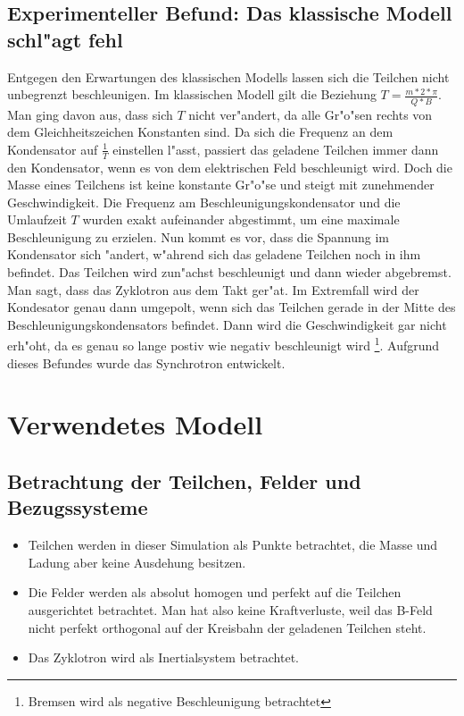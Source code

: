 \documentclass[14pt, a4paper]{report}
\begin{document}
\section{Experimenteller Befund: Das klassische Modell schl"agt fehl}
Entgegen den Erwartungen des klassischen Modells
lassen sich die Teilchen nicht unbegrenzt beschleunigen. Im klassischen Modell
gilt die Beziehung $T = \frac{m * 2 * \pi }{Q * B}$.
Man ging davon aus, dass sich $T$ nicht ver"andert, da alle Gr"o"sen rechts von dem 
Gleichheitszeichen Konstanten sind. Da sich die Frequenz an dem Kondensator auf
$\frac{1}{T}$ einstellen l"asst, passiert das geladene Teilchen immer dann den Kondensator,
wenn es von dem elektrischen Feld beschleunigt wird. Doch die Masse eines Teilchens
ist keine konstante Gr"o"se  und steigt mit zunehmender 
Geschwindigkeit. Die Frequenz am Beschleunigungskondensator und die Umlaufzeit $T$ 
wurden
exakt aufeinander abgestimmt, um eine maximale Beschleunigung zu erzielen.
Nun kommt es vor, dass die Spannung im Kondensator sich "andert, w"ahrend sich das 
geladene Teilchen noch in ihm befindet. Das Teilchen wird zun"achst beschleunigt und
dann wieder abgebremst. Man sagt, dass das Zyklotron aus dem Takt ger"at.
Im Extremfall wird der Kondesator genau dann umgepolt, wenn sich das 
Teilchen gerade in der Mitte des Beschleunigungskondensators befindet. Dann wird die 
Geschwindigkeit gar nicht erh"oht, da es genau so lange postiv wie negativ beschleunigt 
wird \footnote{Bremsen wird als negative Beschleunigung betrachtet}.
Aufgrund dieses Befundes wurde das Synchrotron entwickelt.

\chapter{Verwendetes Modell}
\section{Betrachtung der Teilchen, Felder und Bezugssysteme}
\begin{itemize}
\item Teilchen werden in dieser Simulation als Punkte betrachtet, die Masse und Ladung aber keine 
Ausdehung besitzen.
\item Die Felder werden als absolut homogen und perfekt auf die Teilchen ausgerichtet
betrachtet. Man hat also keine Kraftverluste, weil das B-Feld nicht perfekt
orthogonal auf der Kreisbahn der geladenen Teilchen steht.
\item Das Zyklotron wird als Inertialsystem betrachtet.
\end{itemize}
\end{document}
